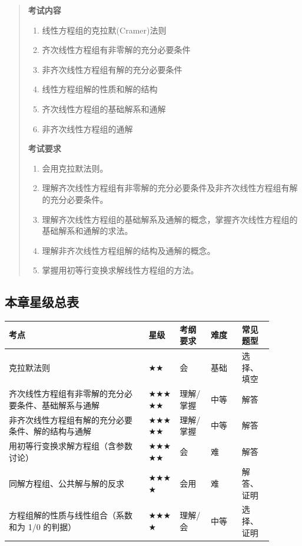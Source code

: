 \documentclass[11pt,openany,UTF8]{ctexbook}
\begin{document}
\begin{quote}
\textbf{考试内容}

\begin{enumerate}
\item 线性方程组的克拉默(Cramer)法则
\item 齐次线性方程组有非零解的充分必要条件
\item 非齐次线性方程组有解的充分必要条件
\item 线性方程组解的性质和解的结构
\item 齐次线性方程组的基础解系和通解
\item 非齐次线性方程组的通解
\end{enumerate}
\textbf{考试要求}

\begin{enumerate}
\item 会用克拉默法则。
\item 理解齐次线性方程组有非零解的充分必要条件及非齐次线性方程组有解的充分必要条件。
\item 理解齐次线性方程组的基础解系及通解的概念，掌握齐次线性方程组的基础解系和通解的求法。
\item 理解非齐次线性方程组解的结构及通解的概念。
\item 掌握用初等行变换求解线性方程组的方法。
\end{enumerate}
\end{quote}
\subsection*{本章星级总表}

\begingroup\small\setlength{\tabcolsep}{4.0pt}
\begin{longtable}{@{}L{0.4549\linewidth}L{0.1098\linewidth}L{0.1098\linewidth}L{0.1098\linewidth}L{0.1098\linewidth}@{}}
\toprule
\textbf{考点} & \textbf{星级} & \textbf{考纲要求} & \textbf{难度} & \textbf{常见题型} \\
\midrule
\endhead
克拉默法则 & $\bigstar$$\bigstar$ & 会 & 基础 & 选择、填空 \\
齐次线性方程组有非零解的充分必要条件、基础解系与通解 & $\bigstar$$\bigstar$$\bigstar$$\bigstar$$\bigstar$ & 理解/掌握 & 中等 & 解答 \\
非齐次线性方程组有解的充分必要条件、解的结构与通解 & $\bigstar$$\bigstar$$\bigstar$$\bigstar$$\bigstar$ & 理解/掌握 & 中等 & 解答 \\
用初等行变换求解方程组（含参数讨论） & $\bigstar$$\bigstar$$\bigstar$$\bigstar$$\bigstar$ & 会 & 难 & 解答 \\
同解方程组、公共解与解的反求 & $\bigstar$$\bigstar$$\bigstar$$\bigstar$ & 会用 & 难 & 解答、证明 \\
方程组解的性质与线性组合（系数和为 1/0 的判据） & $\bigstar$$\bigstar$$\bigstar$$\bigstar$ & 理解/会 & 中等 & 选择、证明 \\
\bottomrule
\end{longtable}
\endgroup
\end{document}
